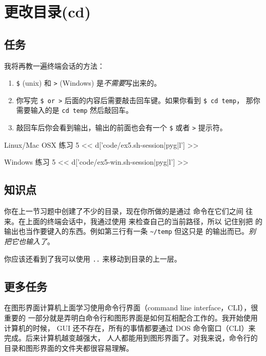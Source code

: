 \chapter{更改目录(cd)}

\section{任务}

我将再教一遍终端会话的方法：

\begin{enumerate} 
\item \verb|$| (unix) 和 \verb|>| (Windows) 是\emph{不需要}写出来的。
\item 你写完 \verb|$ or >| 后面的内容后需要敲击回车键。如果你看到 \verb|$ cd temp|，
那你需要输入的是 \verb|cd temp| 然后敲回车。
\item 敲回车后你会看到输出，输出的前面也会有一个 \verb|$| 或者 \verb|>| 提示符。
\end{enumerate}

\begin{code}{Linux/Mac OSX 练习 5}
<< d['code/ex5.sh-session|pyg|l'] >>
\end{code}

\begin{code}{Windows 练习 5}
<< d['code/ex5-win.sh-session|pyg|l'] >>
\end{code}

\section{知识点}

你在上一节习题中创建了不少的目录，现在你所做的是通过  命令在它们之间
往来。在上面的终端会话中，我通过使用  来检查自己的当前路径，所以
记住别把  的输出也当作要键入的东西。例如第三行有一条 \verb|~/temp| 
但这只是  的输出而已。\emph{别把它也输入了}。

你应该还看到了我可以使用 \verb|..| 来移动到目录的上一层。


\section{更多任务}

在图形界面计算机上面学习使用命令行界面（command line interface，CLI），很重要的
一部分就是弄明白命令行和图形界面是如何互相配合工作的。我开始使用计算机的时候，
GUI 还不存在，所有的事情都要通过 DOS 命令窗口（CLI）来完成。后来计算机越变越强大，
人人都能用到图形界面了。对我来说，命令行的目录和图形界面的文件夹都很容易理解。

